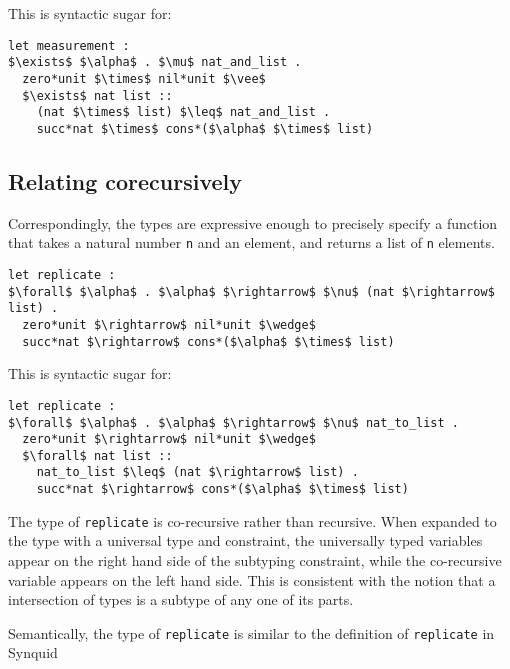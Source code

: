 \documentclass[sigplan,screen]{acmart}
\begin{document}
\hfill

\noindent This is syntactic sugar for:

\begin{lstlisting}[]
let measurement : 
$\exists$ $\alpha$ . $\mu$ nat_and_list .
  zero*unit $\times$ nil*unit $\vee$ 
  $\exists$ nat list :: 
    (nat $\times$ list) $\leq$ nat_and_list .
    succ*nat $\times$ cons*($\alpha$ $\times$ list)
\end{lstlisting}

\subsection{Relating corecursively}

\noindent Correspondingly, the types are expressive enough to precisely specify
a function that takes a natural number \lstinline{n} 
and an element, and returns a list of \lstinline{n} elements.

\begin{lstlisting}[]
let replicate : 
$\forall$ $\alpha$ . $\alpha$ $\rightarrow$ $\nu$ (nat $\rightarrow$ list) .
  zero*unit $\rightarrow$ nil*unit $\wedge$
  succ*nat $\rightarrow$ cons*($\alpha$ $\times$ list)
\end{lstlisting}



\hfill

\noindent This is syntactic sugar for:

\begin{lstlisting}[]
let replicate : 
$\forall$ $\alpha$ . $\alpha$ $\rightarrow$ $\nu$ nat_to_list .
  zero*unit $\rightarrow$ nil*unit $\wedge$
  $\forall$ nat list :: 
    nat_to_list $\leq$ (nat $\rightarrow$ list) .
    succ*nat $\rightarrow$ cons*($\alpha$ $\times$ list)
\end{lstlisting}

\hfill

\noindent The type of \lstinline{replicate} is co-recursive rather than recursive. 
When expanded to the type with a universal type and constraint, 
the universally typed variables appear on the right hand side 
of the subtyping constraint, while the co-recursive variable
appears on the left hand side. This is consistent with the notion
that a intersection of types is a subtype of any one of its parts.

\hfill

\noindent Semantically, the type of \lstinline{replicate} is similar to the definition of 
\lstinline{replicate} in Synquid \cite{}    
\end{document}
